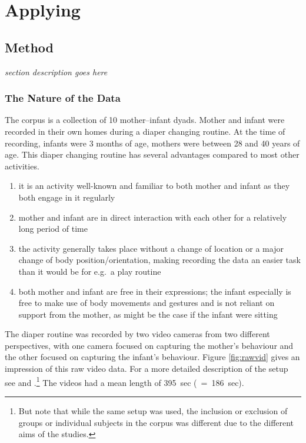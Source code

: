 
\chapter{Applying \fpmupper}
\label{ch:fpm}

\section{Method}
\label{sec:fpmmet}
\textit{section description goes here}

\subsection{The Nature of the Data}
\label{ssec:fpmmetnat}
The corpus is a collection of 10 mother--infant dyads.
Mother and infant were recorded in their own homes during a diaper changing routine.
At the time of recording, infants were 3 months of age, mothers were between 28 and 40 years of age.
This diaper changing routine has several advantages compared to most other activities.
\begin{enumerate}[label={\alph*)}]
	\item it is an activity well-known and familiar to both mother and infant as they both engage in it regularly
	\item mother and infant are in direct interaction with each other for a relatively long period of time
	\item the activity generally takes place without a change of location or a major change of body position/orientation, making recording the data an easier task than it would be for e.g.~a play routine
	\item both mother and infant are free in their expressions; the infant especially is free to make use of body movements and gestures and is not reliant on support from the mother, as might be the case if the infant were sitting
\end{enumerate}
The diaper routine was recorded by two video cameras from two different perspectives, with one camera focused on capturing the mother's behaviour and the other focused on capturing the infant's behaviour.
Figure \ref{fig:rawvid} gives an impression of this raw video data.
For a more detailed description of the setup see \citet[]{nomikou_verbs_2017} and \citet[]{nomikou_language_2011}.\footnote{But note that while the same setup was used, the inclusion or exclusion of groups or individual subjects in the corpus was different due to the different aims of the studies.}
The videos had a mean length of 395~sec (\sd~=~186~sec).

